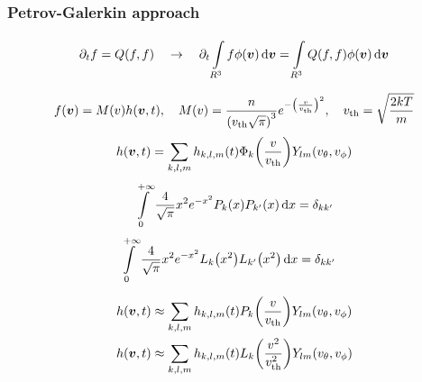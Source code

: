 \documentclass[mathserif, aspectratio=169]{beamer}
\newcommand{\ud}{\,\mathrm{d}}
\newcommand{\vect}[1]{\boldsymbol{#1}}
\newcommand{\of}[1]{\mleft( #1 \mright)}
\newcommand{\vth}{v_{\textrm{th}}}
\newcommand{\myint}[2]{\int\limits_{#1}^{#2}}
\begin{document}
\begin{frame}
\frametitle{Petrov-Galerkin approach}
%
\small
\begin{align*}
\partial_t f = Q(f,f)
\quad \rightarrow \quad
\partial_t \myint{R^3}{} f \phi\of{\vect{v}} \ud \vect{v} =
\myint{R^3}{} Q(f,f) \phi\of{\vect{v}} \ud \vect{v}
\end{align*}

\begin{align*}
f\of{\vect{v}} = M\of{v} h\of{\vect{v},t}
, \quad
M\of{v} = \frac{n}{\left( \vth \sqrt{\pi} \right)^3} e^{-\left(\frac{v}{\vth}\right)^2}
, \quad
\vth = \sqrt{\frac{2kT}{m}}
\end{align*}
\begin{align*}
h\of{\vect{v},t} =
\sum_{k,l,m} h_{k,l,m} \of{t} \Phi_k\of{\frac{v}{\vth}} Y_{lm}\of{v_\theta, v_\phi}
\end{align*}
\begin{align*}
\myint{0}{+\infty} \frac{4}{\sqrt{\pi}} x^2 e^{-x^2} P_k\of{x} P_{k^\prime}\of{x} \ud x = \delta_{kk^\prime}
\end{align*}
\begin{align*}
\myint{0}{+\infty} \frac{4}{\sqrt{\pi}} x^2 e^{-x^2} L_k\of{x^2} L_{k^\prime}\of{x^2} \ud x &= \delta_{kk^\prime}
\end{align*}

\begin{align*}
h\of{\vect{v},t} &\approx
\sum_{k,l,m} h_{k,l,m} \of{t} P_k\of{\frac{v}{\vth}} Y_{lm}\of{v_\theta, v_\phi}
\\
h\of{\vect{v},t} &\approx
\sum_{k,l,m} h_{k,l,m} \of{t} L_k\of{\frac{v^2}{\vth^2}} Y_{lm}\of{v_\theta, v_\phi}
\end{align*}

%
\end{frame}
\end{document}
